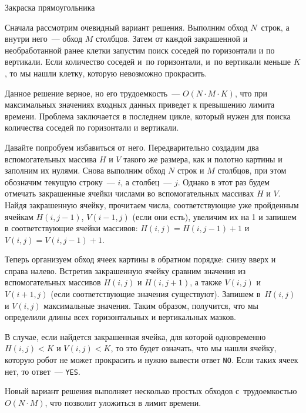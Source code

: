 \begin{tutorial}{Закраска прямоугольника}

Сначала рассмотрим очевидный вариант решения. Выполним обход $N$~строк, а внутри него~--- обход $M$ столбцов. Затем от каждой закрашенной и необработанной ранее клетки запустим поиск соседей по горизонтали и по вертикали. Если количество соседей и~по горизонтали, и~по вертикали меньше $K$, то мы нашли клетку, которую невозможно прокрасить.

Данное решение верное, но его трудоемкость~--- $O(N \cdot M \cdot K)$, что при максимальных значениях входных данных приведет к превышению лимита времени. Проблема заключается в последнем цикле, который нужен для поиска количества соседей по горизонтали и вертикали.

Давайте попробуем избавиться от него. Передварительно создадим два вспомогательных массива $H$ и $V$ такого же размера, как и полотно картины и заполним их нулями. Снова выполним обход $N$ строк и $M$ столбцов, при этом обозначим текущую строку~--- $i$, а столбец~--- $j$. Однако в этот раз будем отмечать закрашенные ячейки числами во вспомогательных массивах $H$ и $V$. Найдя закрашенную ячейку, прочитаем числа, соответствующие уже пройденным ячейкам $H(i, j-1)$, $V(i-1, j)$ (если они есть), увеличим их на 1 и запишем в соответствующие ячейки массивов: $H(i, j) = H(i, j-1) + 1$ и $V(i, j) = V(i, j-1) + 1$.

Теперь организуем обход ячеек картины в обратном порядке: снизу вверх и справа налево. Встретив закрашенную ячейку сравним значения из вспомогательных массивов $H(i,j)$ и $H(i,j+1)$, а также $V(i,j)$ и $V(i+1,j)$ (если соответствующие значения существуют). Запишем в~$H(i,j)$ и $V(i,j)$ максимальные значения. Таким образом, получится, что мы определили длины всех горизонтальных и вертикальных мазков.

В случае, если найдется закрашенная ячейка, для которой одновременно $H(i,j) < K$ и $V(i,j)  < K$, то это будет означать, что мы нашли ячейку, которую робот не может прокрасить и нужно вывести ответ \texttt{NO}. Если таких ячеек нет, то ответ~--- \texttt{YES}.

Новый вариант решения выполняет несколько простых обходов с~трудоемкостью $O(N \cdot M)$, что позволит уложиться в лимит времени.

\end{tutorial}

